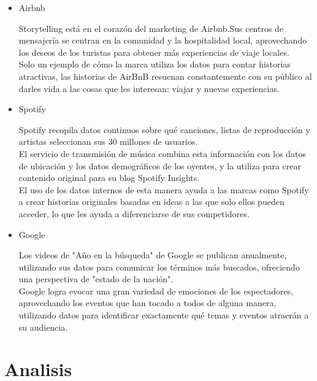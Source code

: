 \documentclass[preprint,12pt]{elsarticle}
\begin{document}
\begin{itemize}
		\item Airbnb

Storytelling está en el corazón del marketing de Airbnb.Sus centros de mensajería se centran en la comunidad y la hospitalidad local, aprovechando los deseos de los turistas para obtener más experiencias de viaje locales. \\

Solo un ejemplo de cómo la marca utiliza los datos para contar historias atractivas, las historias de AirBnB resuenan constantemente con su público al darles vida a las cosas que les interesan: viajar y nuevas experiencias.\\

		\item Spotify

Spotify recopila datos continuos sobre qué canciones, listas de reproducción y artistas seleccionan sus 30 millones de usuarios.\\  

El servicio de transmisión de música combina esta información con los datos de ubicación y los datos demográficos de los oyentes, y la utiliza para crear contenido original para su blog Spotify Insights.\\

El uso de los datos internos de esta manera ayuda a las marcas como Spotify a crear historias originales basadas en ideas a las que solo ellos pueden acceder, lo que les ayuda a diferenciarse de sus competidores.\\

		\item Google

Los videos de "Año en la búsqueda" de Google se publican anualmente, utilizando sus datos para comunicar los términos más buscados, ofreciendo una perspectiva de "estado de la nación".\\

Google logra evocar una gran variedad de emociones de los espectadores, aprovechando los eventos que han tocado a todos de alguna manera, utilizando datos para identificar exactamente qué temas y eventos atraerán a su audiencia.\\

\end{itemize}



\section{Analisis}
	\label{S:1}
\end{document}

